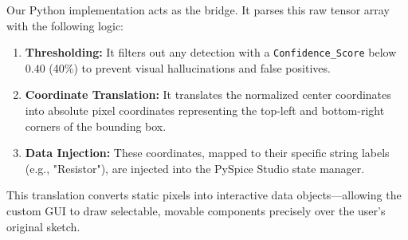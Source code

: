 Our Python implementation acts as the bridge. It parses this raw tensor array with the following logic:
\begin{enumerate}
    \item \textbf{Thresholding:} It filters out any detection with a \texttt{Confidence\_Score} below $0.40$ (40\%) to prevent visual hallucinations and false positives.
    \item \textbf{Coordinate Translation:} It translates the normalized center coordinates into absolute pixel coordinates representing the top-left and bottom-right corners of the bounding box.
    \item \textbf{Data Injection:} These coordinates, mapped to their specific string labels (e.g., "Resistor"), are injected into the PySpice Studio state manager.
\end{enumerate}

This translation converts static pixels into interactive data objects—allowing the custom GUI to draw selectable, movable components precisely over the user's original sketch.
